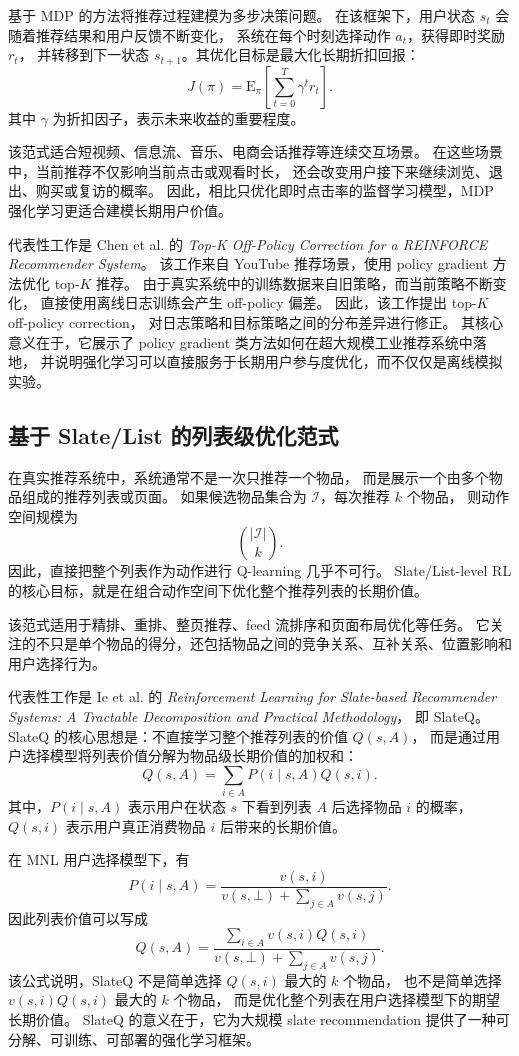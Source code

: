 \documentclass[11pt]{ctexart}
\begin{document}
基于 MDP 的方法将推荐过程建模为多步决策问题。
在该框架下，用户状态 $s_t$ 会随着推荐结果和用户反馈不断变化，
系统在每个时刻选择动作 $a_t$，获得即时奖励 $r_t$，
并转移到下一状态 $s_{t+1}$。其优化目标是最大化长期折扣回报：
\[
J(\pi)
=
\mathrm{E}_{\pi}
\left[
\sum_{t=0}^{T}\gamma^t r_t
\right].
\]
其中 $\gamma$ 为折扣因子，表示未来收益的重要程度。

该范式适合短视频、信息流、音乐、电商会话推荐等连续交互场景。
在这些场景中，当前推荐不仅影响当前点击或观看时长，
还会改变用户接下来继续浏览、退出、购买或复访的概率。
因此，相比只优化即时点击率的监督学习模型，MDP 强化学习更适合建模长期用户价值。

代表性工作是 Chen et al. 的
\textit{Top-K Off-Policy Correction for a REINFORCE Recommender System}。
该工作来自 YouTube 推荐场景，使用 policy gradient 方法优化 top-$K$ 推荐。
由于真实系统中的训练数据来自旧策略，而当前策略不断变化，
直接使用离线日志训练会产生 off-policy 偏差。
因此，该工作提出 top-$K$ off-policy correction，
对日志策略和目标策略之间的分布差异进行修正。
其核心意义在于，它展示了 policy gradient 类方法如何在超大规模工业推荐系统中落地，
并说明强化学习可以直接服务于长期用户参与度优化，而不仅仅是离线模拟实验。

\subsection{基于 Slate/List 的列表级优化范式}

在真实推荐系统中，系统通常不是一次只推荐一个物品，
而是展示一个由多个物品组成的推荐列表或页面。
如果候选物品集合为 $\mathcal{I}$，每次推荐 $k$ 个物品，
则动作空间规模为
\[
\binom{|\mathcal{I}|}{k}.
\]
因此，直接把整个列表作为动作进行 Q-learning 几乎不可行。
Slate/List-level RL 的核心目标，就是在组合动作空间下优化整个推荐列表的长期价值。

该范式适用于精排、重排、整页推荐、feed 流排序和页面布局优化等任务。
它关注的不只是单个物品的得分，还包括物品之间的竞争关系、互补关系、位置影响和用户选择行为。

代表性工作是 Ie et al. 的
\textit{Reinforcement Learning for Slate-based Recommender Systems: A Tractable Decomposition and Practical Methodology}，
即 SlateQ。
SlateQ 的核心思想是：不直接学习整个推荐列表的价值 $Q(s,A)$，
而是通过用户选择模型将列表价值分解为物品级长期价值的加权和：
\[
Q(s,A)
=
\sum_{i\in A}
P(i\mid s,A)Q(s,i).
\]
其中，$P(i\mid s,A)$ 表示用户在状态 $s$ 下看到列表 $A$ 后选择物品 $i$ 的概率，
$Q(s,i)$ 表示用户真正消费物品 $i$ 后带来的长期价值。

在 MNL 用户选择模型下，有
\[
P(i\mid s,A)
=
\frac{v(s,i)}
{v(s,\bot)+\sum_{j\in A}v(s,j)}.
\]
因此列表价值可以写成
\[
Q(s,A)
=
\frac{
\sum_{i\in A}v(s,i)Q(s,i)
}{
v(s,\bot)+\sum_{j\in A}v(s,j)
}.
\]
该公式说明，SlateQ 不是简单选择 $Q(s,i)$ 最大的 $k$ 个物品，
也不是简单选择 $v(s,i)Q(s,i)$ 最大的 $k$ 个物品，
而是优化整个列表在用户选择模型下的期望长期价值。
SlateQ 的意义在于，它为大规模 slate recommendation 提供了一种可分解、可训练、可部署的强化学习框架。
\end{document}
